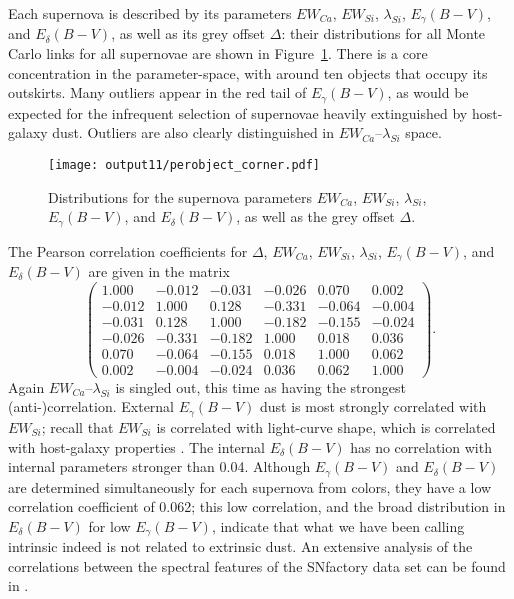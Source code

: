 \documentclass{aastex}   	%
\begin{document}
Each supernova is described by its parameters $EW_{Ca}$, $EW_{Si}$, $\lambda_{Si}$, $E_\gamma(B-V)$, and $E_\delta(B-V)$, as well as its grey offset
$\Delta$: their distributions for all Monte Carlo links for all supernovae are shown in Figure~\ref{perobject:fig}.
There is a core concentration in the  parameter-space, with around ten objects that occupy its outskirts.
Many outliers appear in the red tail of $E_\gamma(B-V)$, as would be expected for the infrequent selection of supernovae
heavily extinguished by host-galaxy dust.
Outliers  are also clearly distinguished in  $EW_{Ca}$--$\lambda_{Si}$ space.

\begin{figure}[htbp] %
   \centering
   \texttt{[image: output11/perobject\_corner.pdf]} 
   \caption{Distributions for the supernova parameters $EW_{Ca}$, $EW_{Si}$, $\lambda_{Si}$, $E_\gamma(B-V)$, and $E_\delta(B-V)$, as well as the grey offset
$\Delta$.
   \label{perobject:fig}}
\end{figure}

The Pearson correlation coefficients for $\Delta$, $EW_{Ca}$, $EW_{Si}$, $\lambda_{Si}$, $E_\gamma(B-V)$, and $E_\delta(B-V)$ are given in the matrix
\begin{equation}
\begin{pmatrix}
1.000 & -0.012 & -0.031 & -0.026 & 0.070 & 0.002 \\
-0.012 & 1.000 & 0.128 & -0.331 & -0.064 & -0.004 \\
-0.031 & 0.128 & 1.000 & -0.182 & -0.155 & -0.024 \\
-0.026 & -0.331 & -0.182 & 1.000 & 0.018 & 0.036 \\
0.070 & -0.064 & -0.155 & 0.018 & 1.000 & 0.062 \\
0.002 & -0.004 & -0.024 & 0.036 & 0.062 & 1.000
\end{pmatrix}.
\end{equation}
Again  $EW_{Ca}$--$\lambda_{Si}$ is singled out, this time as having the strongest (anti-)correlation.  
External $E_\gamma(B-V)$ dust is
most strongly correlated with $EW_{Si}$; recall that $EW_{Si}$ is correlated with light-curve shape, which is correlated with host-galaxy properties
\citep{2003MNRAS.340.1057S}.
The internal $E_\delta(B-V)$  has no correlation  with internal parameters stronger than
0.04.  Although $E_\gamma(B-V)$ and $E_\delta(B-V)$ are determined simultaneously for each supernova from colors, they have a low correlation coefficient of 0.062;
this low correlation, and the broad distribution in $E_\delta(B-V)$ for low $E_\gamma(B-V)$,  indicate that what we have been calling intrinsic
indeed is not related to extrinsic dust.
An extensive analysis of the correlations between the spectral features of the SNfactory data set can be found in \citet{chotard:thesis}.
\end{document}
